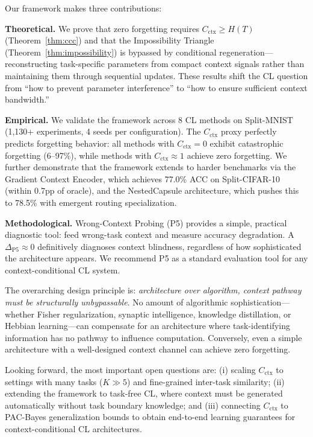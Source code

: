 \documentclass{article}
\begin{document}
Our framework makes three contributions:

\textbf{Theoretical.} We prove that zero forgetting requires $C_\mathrm{ctx} \geq H(T)$ (Theorem~\ref{thm:ccc}) and that the Impossibility Triangle (Theorem~\ref{thm:impossibility}) is bypassed by conditional regeneration---reconstructing task-specific parameters from compact context signals rather than maintaining them through sequential updates. These results shift the CL question from ``how to prevent parameter interference'' to ``how to ensure sufficient context bandwidth.''

\textbf{Empirical.} We validate the framework across 8 CL methods on Split-MNIST (1,130+ experiments, 4 seeds per configuration). The $C_\mathrm{ctx}$ proxy perfectly predicts forgetting behavior: all methods with $C_\mathrm{ctx} = 0$ exhibit catastrophic forgetting (6--97\%), while methods with $C_\mathrm{ctx} \approx 1$ achieve zero forgetting. We further demonstrate that the framework extends to harder benchmarks via the Gradient Context Encoder, which achieves 77.0\% ACC on Split-CIFAR-10 (within 0.7pp of oracle), and the NestedCapsule architecture, which pushes this to 78.5\% with emergent routing specialization.

\textbf{Methodological.} Wrong-Context Probing (P5) provides a simple, practical diagnostic tool: feed wrong-task context and measure accuracy degradation. A $\Delta_\mathrm{P5} \approx 0$ definitively diagnoses context blindness, regardless of how sophisticated the architecture appears. We recommend P5 as a standard evaluation tool for any context-conditional CL system.

The overarching design principle is: \emph{architecture over algorithm, context pathway must be structurally unbypassable}. No amount of algorithmic sophistication---whether Fisher regularization, synaptic intelligence, knowledge distillation, or Hebbian learning---can compensate for an architecture where task-identifying information has no pathway to influence computation. Conversely, even a simple architecture with a well-designed context channel can achieve zero forgetting.

Looking forward, the most important open questions are: (i) scaling $C_\mathrm{ctx}$ to settings with many tasks ($K \gg 5$) and fine-grained inter-task similarity; (ii) extending the framework to task-free CL, where context must be generated automatically without task boundary knowledge; and (iii) connecting $C_\mathrm{ctx}$ to PAC-Bayes generalization bounds to obtain end-to-end learning guarantees for context-conditional CL architectures.
\end{document}

